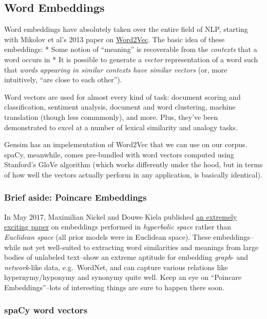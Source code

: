 \documentclass[11pt]{article}
\begin{document}
    \hypertarget{word-embeddings}{%
\subsection{Word Embeddings}\label{word-embeddings}}

Word embeddings have absolutely taken over the entire field of NLP,
starting with Mikolov et al's 2013 paper on
\href{https://arxiv.org/abs/1301.3781}{Word2Vec}. The basic idea of
these embeddings: * Some notion of ``meaning'' is recoverable from the
\emph{contexts} that a word occurs in * It is possible to generate a
\emph{vector} representation of a word such that \emph{words appearing
in similar contexts have similar vectors} (or, more intuitively, ``are
close to each other'').

Word vectors are used for almost every kind of task: document scoring
and classification, sentiment analysis, document and word clustering,
machine translation (though less commmonly), and more. Plus, they've
been demonstrated to excel at a number of lexical similarity and analogy
tasks.

Gensim has an impelementation of Word2Vec that we can use on our corpus.
spaCy, meanwhile, comes pre-bundled with word vectors computed using
Stanford's GloVe algorithm (which works differently under the hood, but
in terms of how well the vectors actually perform in any application, is
basically identical).

\hypertarget{brief-aside-poincare-embeddings}{%
\subsubsection{Brief aside: Poincare
Embeddings}\label{brief-aside-poincare-embeddings}}

In May 2017, Maximilian Nickel and Douwe Kiela published
\href{https://arxiv.org/pdf/1705.08039}{an extremely exciting paper} on
embeddings performed in \emph{hyperbolic space} rather than
\emph{Euclidean space} (all prior models were in Euclidean space). These
embeddings--while not yet well-suited to extracting word similarities
and meanings from large bodies of unlabeled text--show an extreme
aptitude for embedding \emph{graph}- and \emph{network}-like data,
e.g.~WordNet, and can capture various relations like hypernymy/hyponymy
and synonymy quite well. Keep an eye on ``Poincare Embeddings''--lots of
interesting things are sure to happen there soon.

\hypertarget{spacy-word-vectors}{%
\subsubsection{spaCy word vectors}\label{spacy-word-vectors}}
\end{document}
